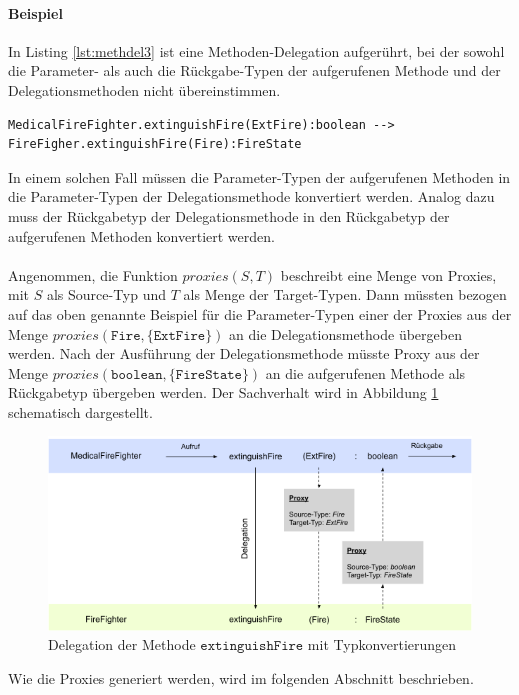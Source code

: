 \documentclass[a4paper,12pt]{article}
\begin{document}
\paragraph{Beispiel} In Listing \ref{lst:methdel3} ist eine Methoden-Delegation aufgerührt, bei der sowohl die Parameter- als auch die Rückgabe-Typen der aufgerufenen Methode und der Delegationsmethoden nicht übereinstimmen.
\begin{lstlisting}[style = dsl]
	MedicalFireFighter.extinguishFire(ExtFire):boolean --> FireFigher.extinguishFire(Fire):FireState
\end{lstlisting}\label{lst:methdel3}
\noindent
In einem solchen Fall müssen die Parameter-Typen der aufgerufenen Methoden in die Parameter-Typen der Delegationsmethode konvertiert werden. Analog dazu muss der Rückgabetyp der Delegationsmethode in den Rückgabetyp der aufgerufenen Methoden konvertiert werden.\\\\
Angenommen, die Funktion $\mathit{proxies(S,T)}$ beschreibt eine Menge von Proxies, mit $S$ als Source-Typ und $T$ als Menge der Target-Typen. Dann müssten bezogen auf das oben genannte Beispiel für die Parameter-Typen einer der Proxies aus der Menge $\mathit{proxies(\texttt{Fire}, \{\texttt{ExtFire}\})}$ an die Delegationsmethode übergeben werden. Nach der Ausführung der Delegationsmethode müsste Proxy aus der Menge $\mathit{proxies(\texttt{boolean},\{\texttt{FireState}\})}$ an die aufgerufenen Methode als Rückgabetyp übergeben werden. Der Sachverhalt wird in Abbildung \ref{fig:DEL_extinguishFire} schematisch dargestellt.
\begin{figure}[H]
\includegraphics[width=\linewidth]{MDEL_extinguishFire}
\caption{Delegation der Methode $\texttt{extinguishFire}$ mit Typkonvertierungen}
\label{fig:DEL_extinguishFire}
\end{figure}
\noindent
Wie die Proxies generiert werden, wird im folgenden Abschnitt beschrieben.
\end{document}
